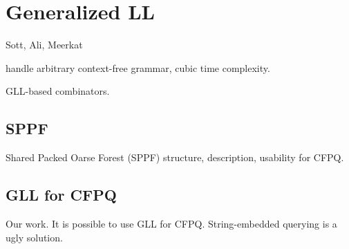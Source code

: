 \section{Generalized LL}

Sott, Ali, Meerkat

handle arbitrary context-free grammar, cubic time complexity.

GLL-based combinators.


\subsection{SPPF}

Shared Packed Oarse Forest (SPPF) structure, description, usability for CFPQ.


\subsection{GLL for CFPQ}

Our work. 
It is possible to use GLL for CFPQ.
String-embedded querying is a ugly solution. 


